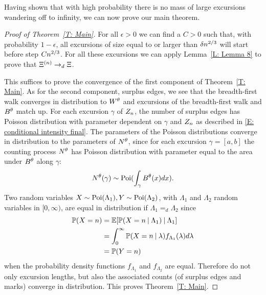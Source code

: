 Having shown that with high probability there is no mass of large excursions wandering off to infinity,
we can now prove our main theorem.

\begin{proof}[Proof of Theorem~\ref{T: Main}]
	
	For all $\epsilon>0$ we can find a $C>0$ such that,
	with probability $1-\epsilon$,
	all excursions of size equal to or larger than $\delta n^{2 / 3}$ will start before step $Cn^{2 / 3}$.
	For all these excursions we can apply Lemma~\ref{L: Lemma 8} to prove that $\Xi^{(n)} \rightarrow_d \Xi$.
	
	This suffices to prove the convergence of the first component of Theorem~\ref{T: Main}.
	As for the second component, surplus edges, 
	we see that the breadth-first walk converges in distribution to $W^{\theta}$
	and excursions of the breadth-first walk and $B^{\theta}$ match up.
	For each excursion $\gamma$ of $Z_n$, 
	the number of surplus edges has Poisson distribution with parameter dependent on $\gamma$ and $Z_n$
	as described in \eqref{E: conditional intensity final}.
	The parameters of the Poisson distributions converge in distribution to the parameters of $N^{\theta}$,
	since for each excursion $\gamma = [a,b]$
	the counting process $N^{\theta}$ has Poisson distribution with parameter equal to the area under $B^{\theta}$ along $\gamma$:
	\begin{equation}
	N^{\theta}(\gamma) \sim \operatorname*{Poi}(\int_{\gamma} B^{\theta}(x) dx ).
	\end{equation}
	Two random variables $X \sim \operatorname*{Poi}(\Lambda_1), Y \sim \operatorname*{Poi}(\Lambda_2)$,
	with $\Lambda_1$ and $\Lambda_2$ random variables in $[0, \infty)$,
	are equal in distribution if $\Lambda_1 =_d \Lambda_2$
	since
	\begin{equation}
	\begin{aligned}
	\mathbb{P}(X = n) 
	&= \mathbb{E}[ \mathbb{P}(X = n \: | \: \Lambda_1) \: | \: \Lambda_1 ] \\
	&= \int_{0}^{\infty} \mathbb{P}(X = n \: | \: \lambda) f_{\Lambda_1}(\lambda) d\lambda \\
	&= \mathbb{P}(Y = n) 
	\end{aligned}
	\end{equation}
	when the probability density functions $f_{\Lambda_1}$ and $f_{\Lambda_2}$ are equal.
	Therefore do not only excursion lengths, but also the associated counts (of surplus edges and marks)
	converge in distribution.
	This proves Theorem~\ref{T: Main}.
	
\end{proof}


\newpage



